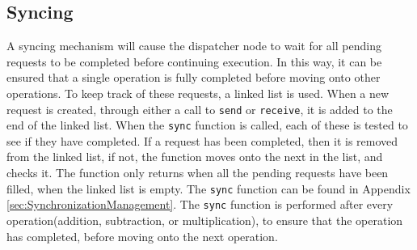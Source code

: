 \subsection{Syncing}
A syncing mechanism will cause the dispatcher node to wait for all pending requests to be completed before continuing execution. In this way, it can be ensured that a single operation is fully completed before moving onto other operations. To keep track of these requests, a linked list is used. When a new request is created, through either a call to \verb|send| or \verb|receive|, it is added to the end of the linked list. When the \verb|sync| function is called, each of these is tested to see if they have completed. If a request has been completed, then it is removed from the linked list, if not, the function moves onto the next in the list, and checks it. The function only returns when all the pending requests have been filled, when the linked list is empty. The \verb|sync| function can be found in Appendix \ref{sec:SynchronizationManagement}. The \verb|sync| function is performed after every operation(addition, subtraction, or multiplication), to ensure that the operation has completed, before moving onto the next operation.